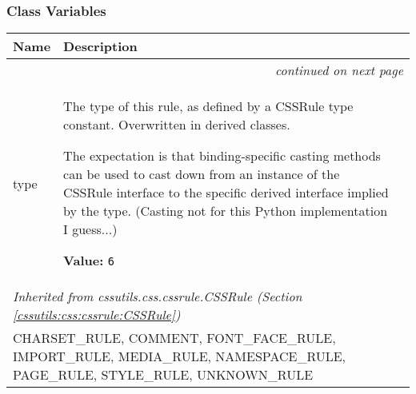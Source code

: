
  \subsubsection{Class Variables}

    \vspace{-1cm}
\hspace{\varindent}\begin{longtable}{|p{\varnamewidth}|p{\vardescrwidth}|l}
\cline{1-2}
\cline{1-2} \centering \textbf{Name} & \centering \textbf{Description}& \\
\cline{1-2}
\endhead\cline{1-2}\multicolumn{3}{r}{\small\textit{continued on next page}}\\\endfoot\cline{1-2}
\endlastfoot\raggedright t\-y\-p\-e\- & \raggedright The type of this rule, as defined by a CSSRule type constant.
Overwritten in derived classes.

The expectation is that binding-specific casting methods can be used to
cast down from an instance of the CSSRule interface to the specific
derived interface implied by the type.
(Casting not for this Python implementation I guess...)

\textbf{Value:} 
{\tt 6}&\\
\cline{1-2}
\multicolumn{2}{|l|}{\textit{Inherited from cssutils.css.cssrule.CSSRule \textit{(Section \ref{cssutils:css:cssrule:CSSRule})}}}\\
\multicolumn{2}{|p{\varwidth}|}{\raggedright CHARSET\_RULE, COMMENT, FONT\_FACE\_RULE, IMPORT\_RULE, MEDIA\_RULE, NAMESPACE\_RULE, PAGE\_RULE, STYLE\_RULE, UNKNOWN\_RULE}\\
\cline{1-2}
\end{longtable}

